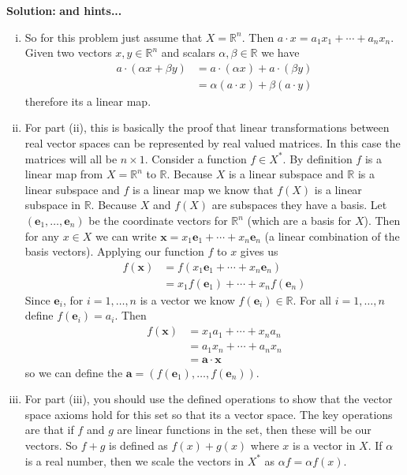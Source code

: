 \documentclass[a4paper,11pt]{article}
\newcounter{problem}
\newenvironment{solution}{ \noindent \textbf{Solution: \medskip}}{}
\begin{document}
\begin{solution} \textbf{and hints...}
	\begin{enumerate}[(i)]
		\item So for this problem just assume that $X = \mathbb{R}^n$.
Then $a\cdot x = a_1 x_1 + \cdots + a_n x_n$.
Given two vectors $x,y \in \mathbb{R}^n$ and scalars $\alpha, \beta \in \mathbb{R}$ we have
\begin{align}
	a \cdot (\alpha x + \beta y) &= a\cdot (\alpha x) + a\cdot (\beta y) \nonumber \\
	&= \alpha(a\cdot x) + \beta (a\cdot y) \nonumber 
\end{align}
therefore its a linear map.
	\item For part (ii), this is basically the proof that linear transformations between real vector spaces can be represented by real valued matrices.
In this case the matrices will all be $n\times 1$.
Consider a function $f\in X^*$.
By definition $f$ is a linear map from $X = \mathbb{R}^n$ to $\mathbb{R}$.
Because $X$ is a linear subspace and $\mathbb{R}$ is a linear subspace and $f$ is a linear map we know that $f(X)$ is a linear subspace in $\mathbb{R}$.
Because $X$ and $f(X)$ are subspaces they have a basis.
Let $(\mathbf{e}_1,\dots, \mathbf{e}_n)$ be the coordinate vectors for $\mathbb{R}^n$ (which are a basis for $X$).
Then for any $x\in X$ we can write $\mathbf{x} = x_1 \mathbf{e}_1 + \cdots + x_n \mathbf{e}_n$ (a linear combination of the basis vectors).
Applying our function $f$ to $x$ gives us
\begin{align}
	f(\mathbf{x}) &= f( x_1 \mathbf{e}_1 + \cdots + x_n \mathbf{e}_n ) \nonumber \\
	&= x_1 f(\mathbf{e}_1) + \cdots + x_n f(\mathbf{e}_n) \nonumber
\end{align}
Since $\mathbf{e}_i$, for $i=1,\dots,n$ is a vector we know $f(\mathbf{e}_i) \in \mathbb{R}$.
For all $i = 1,\dots, n$ define $f(\mathbf{e}_i) = a_i$.
Then 
\begin{align}
	f(\mathbf{x}) &= x_1 a_1 + \cdots + x_n a_n \nonumber \\
	&= a_1 x_n + \cdots + a_n x_n \nonumber \\
	&= \mathbf{a} \cdot \mathbf{x} \nonumber
\end{align}
so we can define the $\mathbf{a} = (f(\mathbf{e}_1), \dots, f(\mathbf{e}_n))$.
	\item For part (iii), you should use the defined operations to show that the vector space axioms hold for this set so that its a vector space.
The key operations are that if $f$ and $g$ are linear functions in the set, then these will be our vectors.
So $f + g$ is defined as $f(x) + g(x)$ where $x$ is a vector in $X$.
If $\alpha$ is a real number, then we scale the vectors in $X^*$ as $\alpha f = \alpha f(x)$.


\end{enumerate}
\end{solution}
\end{document}
